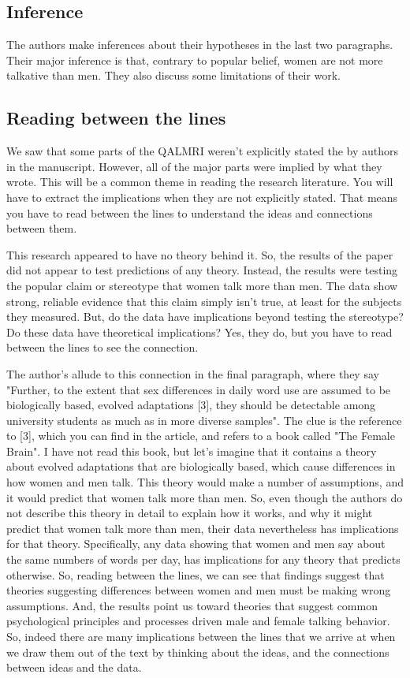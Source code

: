 \subsection{Inference}

The authors make inferences about their hypotheses in the last two paragraphs. Their major inference is that, contrary to popular belief, women are not more talkative than men. They also discuss some limitations of their work.

\subsection{Reading between the lines}

We saw that some parts of the QALMRI weren't explicitly stated the by authors in the manuscript. However, all of the major parts were implied by what they wrote. This will be a common theme in reading the research literature. You will have to extract the implications when they are not explicitly stated. That means you have to read between the lines to understand the ideas and connections between them.

This research appeared to have no theory behind it. So, the results of the paper did not appear to test predictions of any theory. Instead, the results were testing the popular claim or stereotype that women talk more than men. The data show strong, reliable evidence that this claim simply isn't true, at least for the subjects they measured. But, do the data have implications beyond testing the stereotype? Do these data have theoretical implications? Yes, they do, but you have to read between the lines to see the connection.

The author's allude to this connection in the final paragraph, where they say "Further, to the extent that sex differences in daily word use are assumed to be biologically based, evolved adaptations [3], they should be detectable among university students as much as in more diverse samples". The clue is the reference to [3], which you can find in the article, and refers to a book called "The Female Brain". I have not read this book, but let's imagine that it contains a theory about evolved adaptations that are biologically based, which cause differences in how women and men talk. This theory would make a number of assumptions, and it would predict that women talk more than men. So, even though the authors do not describe this theory in detail to explain how it works, and why it might predict that women talk more than men, their data nevertheless has implications for that theory. Specifically, any data showing that women and men say about the same numbers of words per day, has implications for any theory that predicts otherwise. So, reading between the lines, we can see that findings suggest that theories suggesting differences between women and men must be making wrong assumptions. And, the results point us toward theories that suggest common psychological principles and processes driven male and female talking behavior. So, indeed there are many implications between the lines that we arrive at when we draw them out of the text by thinking about the ideas, and the connections between ideas and the data.

